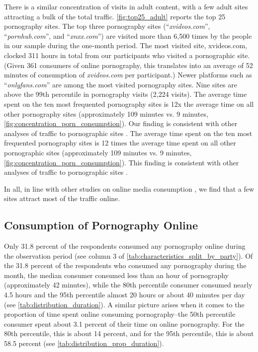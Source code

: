 \documentclass[12pt, letterpaper]{article}
\begin{document}
There is a similar concentration of visits in adult content, with a few adult sites attracting a bulk of the total traffic. \cref{fig:top25_adult} reports the top 25 pornography sites. The top three pornography sites (``\textit{xvideos.com}'', ``\textit{pornhub.com}'', and ``\textit{xnxx.com}'') are visited more than 6,500 times by the people in our sample during the one-month period. The most visited site, xvideos.com, clocked 311 hours in total from our participants who visited a pornographic site. (Given 361 consumers of online pornography, this translates into an average of 52 minutes of consumption of \textit{xvideos.com} per participant.) Newer platforms such as ``\textit{onlyfans.com}'' are among the most visited pornography sites. Nine sites are above the 99th percentile in pornography visits (2,224 visits). The average time spent on the ten most frequented pornography sites is 12x the average time on all other pornography sites (approximately 109 minutes vs. 9 minutes, \cref{fig:concentration_porn_consumption}). Our finding is consistent with other analyses of traffic to pornographic sites \cite{webporn}.
The average time spent on the ten most frequented pornography sites is 12 times the average time spent on all other pornographic sites (approximately 109 minutes vs. 9 minutes, \cref{fig:concentration_porn_consumption}). This finding is consistent with other analyses of traffic to pornographic sites \citep{webporn}.

In all, in line with other studies on online media consumption \citep{Dewan2004-tt, hindman2009myth, webporn}, we find that a few sites attract most of the traffic online.

\subsection{Consumption of Pornography Online}
\label{subsec:concentration_in_porn}

Only 31.8 percent of the respondents consumed any pornography online during the observation period (see column 3 of \cref{tab:characteristics_split_by_party}). Of the 31.8 percent of the respondents who consumed any pornography during the month, the median consumer consumed less than an hour of pornography (approximately 42 minutes), while the 80th percentile consumer consumed nearly 4.5 hours and the 95th percentile almost 20 hours or about 40 minutes per day (see \cref{tab:distribution_duration}). A similar picture arises when it comes to the proportion of time spent online consuming pornography--the 50th percentile consumer spent about 3.1 percent of their time on online pornography. For the 80th percentile, this is about 14 percent, and for the 95th percentile, this is about 58.5 percent (see \cref{tab:distribution_prop_duration}).
\end{document}
